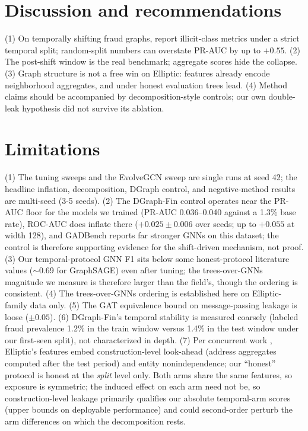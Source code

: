 \documentclass[10pt]{article}
\begin{document}
\section{Discussion and recommendations}
(1) On temporally shifting fraud graphs, report illicit-class metrics under a
strict temporal split; random-split numbers can overstate PR-AUC by up to
$+0.55$. (2) The post-shift window is the real benchmark; aggregate scores hide
the collapse. (3) Graph structure is not a free win on Elliptic: features already
encode neighborhood aggregates, and under honest evaluation trees lead. (4)
Method claims should be accompanied by decomposition-style controls; our own
double-leak hypothesis did not survive its ablation.

\section{Limitations}
\label{sec:limitations}
(1) The tuning sweeps and the EvolveGCN sweep are single runs at seed 42; the
headline inflation, decomposition, DGraph control, and negative-method results are
multi-seed (3-5 seeds). (2) The DGraph-Fin control operates near the
PR-AUC floor for the models we trained (PR-AUC 0.036--0.040 against a 1.3\% base
rate), ROC-AUC does inflate there ($+0.025\pm0.006$ over seeds; up to $+0.055$ at width 128), and GADBench reports far
stronger GNNs on this dataset; the control is therefore supporting evidence for
the shift-driven mechanism, not proof. (3) Our temporal-protocol GNN F1 sits below
some honest-protocol literature values ($\sim$0.69 for GraphSAGE) even after
tuning; the trees-over-GNNs magnitude we measure is therefore larger than the
field's, though the ordering is consistent. (4) The trees-over-GNNs ordering is
established here on Elliptic-family data only. (5) The GAT equivalence bound on
message-passing leakage is loose ($\pm 0.05$). (6) DGraph-Fin's temporal
stability is measured coarsely (labeled fraud prevalence 1.2\% in the train
window versus 1.4\% in the test window under our first-seen split), not
characterized in depth. (7) Per concurrent work \citep{safar2026opacity},
Elliptic's features embed construction-level look-ahead (address aggregates
computed after the test period) and entity nonindependence; our ``honest''
protocol is honest at the \emph{split} level only. Both arms share the same features, so exposure is
symmetric; the induced effect on each arm need not be, so construction-level
leakage primarily qualifies our absolute temporal-arm scores (upper bounds on
deployable performance) and could second-order perturb the arm differences on
which the decomposition rests.
\end{document}
